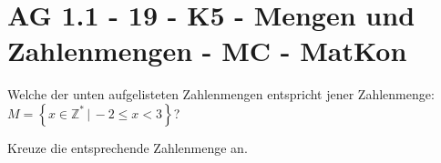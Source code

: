 \section{AG 1.1 - 19 - K5 - Mengen und Zahlenmengen - MC - MatKon}

\begin{beispiel}[AG 1.1]{1}
				Welche der unten aufgelisteten Zahlenmengen entspricht jener Zahlenmenge: $M=\left\{x\in\mathbb{Z}^*\,|\,-2\leq x<3\right\}$?
				
				Kreuze die entsprechende Zahlenmenge an.
				
\end{beispiel}